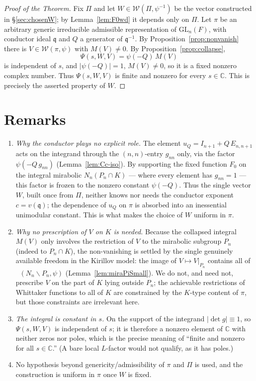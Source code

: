 \documentclass[12pt]{article}
\newcommand{\GL}{\mathrm{GL}}
\newcommand{\qq}{\mathfrak{q}}
\newcommand{\Wmod}{\mathcal{W}}
\DeclareMathOperator{\Cc}{C_c^\infty}
\begin{document}
\begin{proof}[Proof of the Theorem]
Fix $\Pi$ and let $W\in\Wmod(\Pi,\psi^{-1})$ be the vector constructed in
\S\ref{sec:chosenW}; by Lemma~\ref{lem:F0wd} it depends only on $\Pi$. Let $\pi$ be
an arbitrary generic irreducible admissible representation of $\GL_n(F)$, with
conductor ideal $\qq$ and $Q$ a generator of $\qq^{-1}$. By
Proposition~\ref{prop:nonvanish} there is $V\in\Wmod(\pi,\psi)$ with $M(V)\neq0$. By
Proposition~\ref{prop:collapse},
\[
  \Psi(s,W,V)=\psi(-Q)\,M(V)
\]
is independent of $s$, and $|\psi(-Q)|=1$, $M(V)\neq0$, so it is a fixed
nonzero complex number. Thus $\Psi(s,W,V)$ is finite and nonzero for every
$s\in\mathbb C$. This is precisely the asserted property of $W$.
\end{proof}

\section*{Remarks}

\begin{enumerate}
\item \emph{Why the conductor plays no explicit role.} The element
$u_Q=I_{n+1}+Q\,E_{n,n+1}$ acts on the integrand through the $(n,n)$-entry $g_{nn}$
only, via the factor $\psi(-Q\,g_{nn})$ (Lemma~\ref{lem:Cc-iso}). By supporting the
fixed function $F_0$ on the integral mirabolic $N_n(P_n\cap K)$ --- where every
element has $g_{nn}=1$ --- this factor is frozen to the nonzero constant $\psi(-Q)$.
Thus the single vector $W$, built once from $\Pi$, neither knows nor needs the
conductor exponent $c=v(\qq)$; the dependence of $u_Q$ on $\pi$ is absorbed into an
inessential unimodular constant. This is what makes the choice of $W$ uniform in
$\pi$.

\item \emph{Why no prescription of $V$ on $K$ is needed.} Because the collapsed
integral $M(V)$ only involves the restriction of $V$ to the mirabolic subgroup
$P_n$ (indeed to $P_n\cap K$), the non-vanishing is settled by the single genuinely
available freedom in the Kirillov model: the image of $V\mapsto V|_{P_n}$ contains
all of $\Cc(N_n\backslash P_n,\psi)$ (Lemma~\ref{lem:miraPiSmall}). We do not, and
need not, prescribe $V$ on the part of $K$ lying outside $P_n$; the achievable
restrictions of Whittaker functions to all of $K$ are constrained by the $K$-type
content of $\pi$, but those constraints are irrelevant here.

\item \emph{The integral is constant in $s$.} On the support of the integrand
$|\det g|\equiv1$, so $\Psi(s,W,V)$ is independent of $s$; it is therefore a nonzero
element of $\mathbb C$ with neither zeros nor poles, which is the precise meaning of
``finite and nonzero for all $s\in\mathbb C$.'' (A bare local $L$-factor would not
qualify, as it has poles.)

\item No hypothesis beyond genericity/admissibility of $\pi$ and $\Pi$ is used, and
the construction is uniform in $\pi$ once $W$ is fixed.
\end{enumerate}
\end{document}
